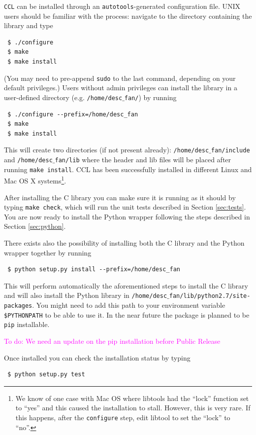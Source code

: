 \documentclass[\docopts]{\docclass}
\newcommand{\todo}[1]{\textcolor{magenta}{To do: #1}}
\begin{document}
{\tt CCL} can be installed through an {\tt autotools}-generated configuration file. UNIX users should be familiar with the process: navigate to the directory containing the library and type
\begin{verbatim}
 $ ./configure
 $ make
 $ make install
\end{verbatim}
(You may need to pre-append {\tt sudo} to the last command, depending on your default privileges.) Users without admin privileges can install the library in a user-defined directory (e.g. {\tt /home/desc$\_$fan/}) by running
\begin{verbatim}
 $ ./configure --prefix=/home/desc_fan
 $ make
 $ make install
\end{verbatim}
This will create two directories (if not present already): {\tt /home/desc$\_$fan/include} and {\tt /home/desc$\_$fan/lib} where the header and lib files will be placed after running {\tt make install}. CCL has been successfully installed in different Linux and Mac OS X systems\footnote{We know of one case with Mac OS where libtools had the ``lock'' function set to ``yes'' and this caused the installation to stall. However, this is very rare. If this happens, after the {\tt configure} step, edit libtool to set the ``lock'' to ``no''.}.

After installing the C library you can make sure it is running as it should by typing {\tt make check}, which will run the unit tests described in Section \ref{sec:tests}. You are now ready to install the Python wrapper following the steps described in Section \ref{sec:python}.

There exists also the possibility of installing both the C library and the Python wrapper together by running
\begin{verbatim}
 $ python setup.py install --prefix=/home/desc_fan
\end{verbatim}
This will perform automatically the aforementioned steps to install the C library and will also install the Python library in {\tt /home/desc$\_$fan/lib/python2.7/site-packages}. You might need to add this path to your environment variable {\tt \$PYTHONPATH} to be able to use it. In the near future the package is planned to be {\tt pip} installable.

\todo{We need an update on the pip installation before Public Release}

Once installed you can check the installation status by typing
\begin{verbatim}
 $ python setup.py test
\end{verbatim}
\end{document}
